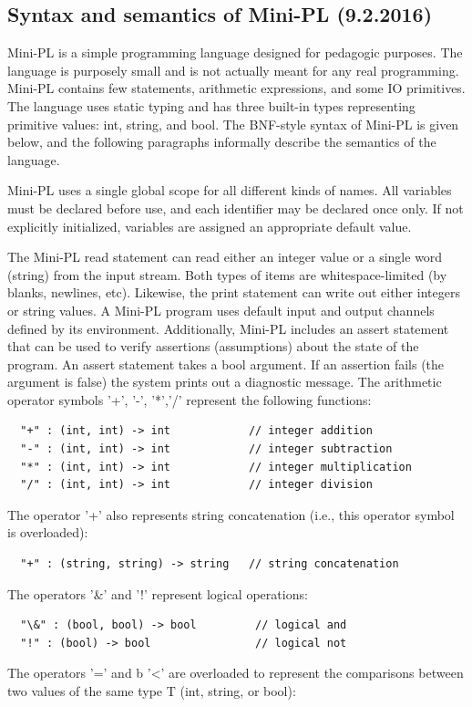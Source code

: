 \documentclass{article}
\begin{document}
\subsection{Syntax and semantics of Mini-PL (9.2.2016)}
Mini-PL is a simple programming language designed for pedagogic purposes. The
language is purposely small and is not actually meant for any real programming.
Mini-PL contains few statements, arithmetic expressions, and some IO
primitives. The language uses static typing and has three built-in types
representing primitive values: int, string, and bool. The BNF-style syntax of
Mini-PL is given below, and the following paragraphs informally describe the
semantics of the language.

Mini-PL uses a single global scope for all different kinds of names. All
variables must be declared before use, and each identifier may be declared once
only. If not explicitly initialized, variables are assigned an appropriate
default value.

The Mini-PL read statement can read either an integer value or a single word
(string) from the input stream. Both types of items are whitespace-limited (by
blanks, newlines, etc). Likewise, the print statement can write out either
integers or string values. A Mini-PL program uses default input and output
channels defined by its environment. Additionally, Mini-PL includes an assert
statement that can be used to verify assertions (assumptions) about the state
of the program. An assert statement takes a bool argument. If an assertion
fails (the argument is false) the system prints out a diagnostic message.  The
arithmetic operator symbols '+', '-', '*','/' represent the following
functions:

\begin{verbatim}
  "+" : (int, int) -> int            // integer addition
  "-" : (int, int) -> int            // integer subtraction
  "*" : (int, int) -> int            // integer multiplication
  "/" : (int, int) -> int            // integer division
\end{verbatim}
The operator '+' also represents string concatenation (i.e., this operator
symbol is overloaded):

\begin{verbatim}
  "+" : (string, string) -> string   // string concatenation
\end{verbatim}
The operators '\&' and '!' represent logical operations:

\begin{verbatim}
  "\&" : (bool, bool) -> bool         // logical and
  "!" : (bool) -> bool                // logical not
\end{verbatim}
The operators '=' and b '<' are overloaded to represent the comparisons between
two values of the same type T (int, string, or bool):
\end{document}
